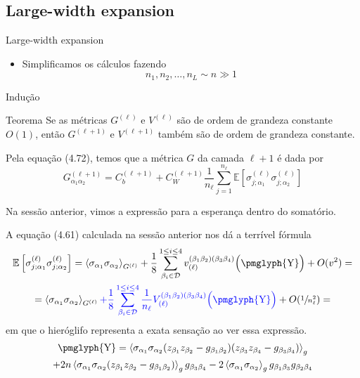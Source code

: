 \documentclass{beamer}
\newcommand{\EE}{\mathbb{E}}
\newcommand{\Dcal}{\mathcal{D}}
\def\mi#1{{\alpha_{#1}}}
\def\mj#1{\beta_{#1}}
\def\eell{{(\ell)}}
\def\eellum{{(\ell+1)}}
\newcommand{\Gnormal}[3]{{G^{(#1)}_{\mi{#2}\mi{#3}}}}
\newcommand{\Verticeinvb}[5]{V_{(#1)}^{(\mj#2\mj#3)(\mj#4\mj#5)}}
\newcommand{\Expectation}[2]{\left\langle #1 \right\rangle_{#2}}
\begin{document}
\subsection{Large-width expansion}

\begin{frame}{Large-width expansion}
	\begin{itemize}
		\item Simplificamos os cálculos fazendo 
		\begin{equation*}\tag{4.84}
			n_1, n_2, \ldots, n_L \sim n \gg 1 
		\end{equation*} 
	\end{itemize}
\end{frame}

\begin{frame}{Indução}
	\begin{block}{Teorema}
		Se as métricas $G^\eell$ e $V^\eell$ são de ordem de grandeza constante $O(1)$, então $G^\eellum$ e $V^\eellum$ também são de ordem de grandeza constante.
	\end{block}
\end{frame}

\begin{frame}
	Pela equação (4.72), temos que a métrica $G$ da camada $\ell+1$ é dada por
	\begin{equation*}
		\Gnormal{\ell+1}12 = C_b^\eellum + C_W^\eellum\frac{1}{n_\ell}\sum_{j=1}^{n_\ell}  \EE\left[\sigma_{j;\mi1}^\eell\sigma_{j;\mi2}^\eell\right]
	\end{equation*}

	Na sessão anterior, vimos a expressão para a esperança dentro do somatório.
\end{frame}

\begin{frame}
	A equação (4.61) calculada na sessão anterior nos dá a terrível fórmula 
	{\small
	\begin{multline*}
		\EE\left[\sigma_{j;\mi1}^\eell\sigma_{j;\mi2}^\eell\right] = \Expectation{\sigma_\mi1\sigma_\mi2}{G^\eell}  + \frac{1}{8} \sum_{\mj{i}\in\Dcal}^{1\le i \le 4}v_{\eell}^{(\mj1\mj2)(\mj3\mj4)}\Big( \text{\pmglyph{Y}} \Big) + O(v^2) =\\
		=  \Expectation{\sigma_\mi1\sigma_\mi2}{G^\eell} { \color{blue} + \frac{1}{8} \sum_{\mj{i}\in\Dcal}^{1\le i \le 4}\frac{1}{n_\ell}\Verticeinvb{\ell}1234\Big( \text{\pmglyph{Y}} \Big) } + O(\sfrac{1}{n_\ell^2}) = \\
	\end{multline*}
	}
	em que o hieróglifo  representa a exata sensação ao ver essa expressão. 
\small 
\begin{multline*} \text{\pmglyph{Y}} = \Expectation{\sigma_{\mi1} \sigma_{\mi2} ( z_{\mj1}z_{\mj2} - g_{\mj1 \mj2} ) ( z_{\mj3} z_{\mj4} - g_{\mj3 \mj4}) }{g} \\
 + 2n \Expectation{\sigma_{\mi1} \sigma_{\mi2} ( z_{\mj1} z_{\mj2} - g_{\mj1 \mj2}) }{g} g_{\mj3 \mj4} - 2 \Expectation{ \sigma_{\mi1} \sigma_{\mi2} }{g} g_{\mj1 \mj3} g_{\mj2 \mj4} \end{multline*}
\end{frame}
\end{document}
